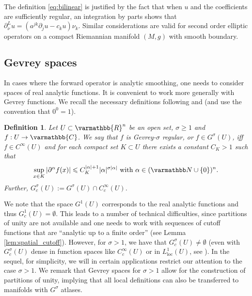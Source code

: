 \documentclass[12pt,twoside]{amsart}
\numberwithin{equation}{section}
\renewcommand{\leq}{\leqslant}
\renewcommand{\geq}{\geqslant}
\renewcommand{\mathbb}{\varmathbb}
\newtheorem{definition}[theorem]{Definition}
\newcommand {\R} {\mathbb{R}} \newcommand {\Z} {\mathbb{Z}}
\newcommand {\C} {\mathbb{C}} \newcommand {\Sn} {\mathbb{S}^n}
\newcommand {\p} {\partial}
\begin{document}
The definition \eqref{eq:bilinear} is justified by the fact that when $u$ and the coefficients are sufficiently regular, an integration by parts shows that $\p_{\nu}^{L}u = (a^{jk} \p_j u - c_k u)\nu_k$. Similar considerations are valid for second order elliptic operators on a compact Riemannian manifold $(M,g)$ with smooth boundary.

\subsection{Gevrey spaces}
\label{sec:Gev_def}

In cases where the forward operator is analytic smoothing, one needs to consider spaces of real analytic functions. It is convenient to work more generally with Gevrey functions. We recall the necessary definitions following \cite{Gramtchev, Rodino_book, HuaRodino, Treves} and \cite[Chapter 8.4]{Hoermander} (and use the convention that $0^0 =1$). 

\begin{definition}
\label{defi:Gsigma}
Let $U \subset \R^n$ be an open set, $\sigma\geq 1$ and $f:U\rightarrow \C$. We say that $f$ is \emph{Gevrey-$\sigma$ regular}, or $f\in G^{\sigma}(U)$, iff $f\in C^{\infty}(U)$ and for each compact set $K\subset U$ there exists a constant $C_K>1$ such that
\begin{align*}
\sup\limits_{x\in K}|\partial^{\alpha}f(x)|\leq C_K^{|\alpha|+1} |\alpha|^{\sigma |\alpha|} \mbox{ with } \alpha \in (\N \cup \{0\})^{n}.
\end{align*}
Further, $G^{\sigma}_c(U):=G^{\sigma}(U)\cap C^{\infty}_c(U)$. \end{definition}

We note that the space $G^1(U)$ corresponds to the real analytic functions and thus $G_c^1(U)= \emptyset$. This leads to a number of technical difficulties, since partitions of unity are not available and one needs to work with sequences of cutoff functions that are ``analytic up to a finite order'' (see Lemma \ref{lem:spatial_cutoff}). However, for $\sigma >1$, we have that $G_c^{\sigma}(U)\neq \emptyset$ (even with $G_c^{\sigma}(U)$ dense in function spaces like $C_c^{\infty}(U)$ or in $L^1_{\mathrm{loc}}(U)$, see \cite[Section 1.4]{Rodino_book}). In the sequel, for simplicity, we will in certain applications restrict our attention to the case $\sigma > 1$. We remark that Gevrey spaces for $\sigma > 1$ allow for the construction of partitions of unity, implying that all local definitions can also be transferred to manifolds with $G^{\sigma}$ atlases.
\end{document}
